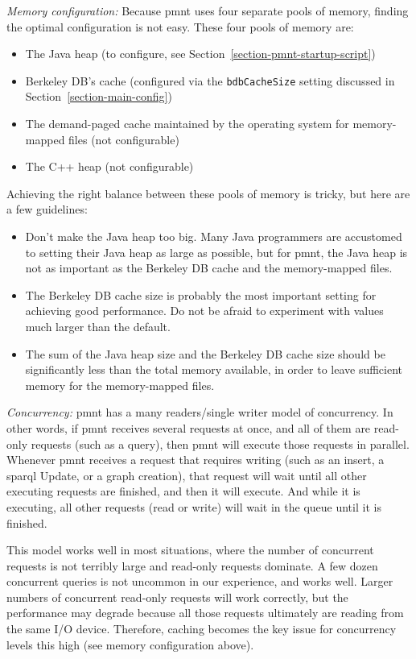 \emph{Memory configuration:} Because \ac{pmnt} uses four separate pools of memory, finding the optimal configuration is not easy.  These four pools of memory are:
\begin{itemize}[noitemsep]
	\item The Java heap (to configure, see Section~\ref{section-pmnt-startup-script})
	\item Berkeley DB's cache (configured via the \texttt{bdbCacheSize} setting discussed in Section~\ref{section-main-config})
	\item The demand-paged cache maintained by the operating system for memory-mapped files (not configurable)
	\item The C++ heap (not configurable)
\end{itemize}
Achieving the right balance between these pools of memory is tricky, but here are a few guidelines:

\begin{itemize}
	\item Don't make the Java heap too big. Many Java programmers are accustomed to setting their Java heap as large as possible, but for \ac{pmnt}, the Java heap is not as important as the Berkeley DB cache and the memory-mapped files.

	\item The Berkeley DB cache size is probably the most important setting for achieving good performance.  Do not be afraid to experiment with values much larger than the default.

	\item The sum of the Java heap size and the Berkeley DB cache size should be significantly less than the total memory available, in order to leave sufficient memory for the memory-mapped files.
\end{itemize}

\emph{Concurrency:} \ac{pmnt} has a many readers/single writer model of concurrency.  In other words, if \ac{pmnt} receives several requests at once, and all of them are read-only requests (such as a query), then \ac{pmnt} will execute those requests in parallel.  Whenever \ac{pmnt} receives a request that requires writing (such as an insert, a \ac{sparql} Update, or a graph creation), that request will wait until all other executing requests are finished, and then it will execute. And while it is executing, all other requests (read or write) will wait in the queue until it is finished.

This model works well in most situations, where the number of concurrent requests is not terribly large and read-only requests dominate.  A few dozen concurrent queries is not uncommon in our experience, and works well.  Larger numbers of concurrent read-only requests will work correctly, but the performance may degrade because all those requests ultimately are reading from the same I/O device.  Therefore, caching becomes the key issue for concurrency levels this high (see memory configuration above).

